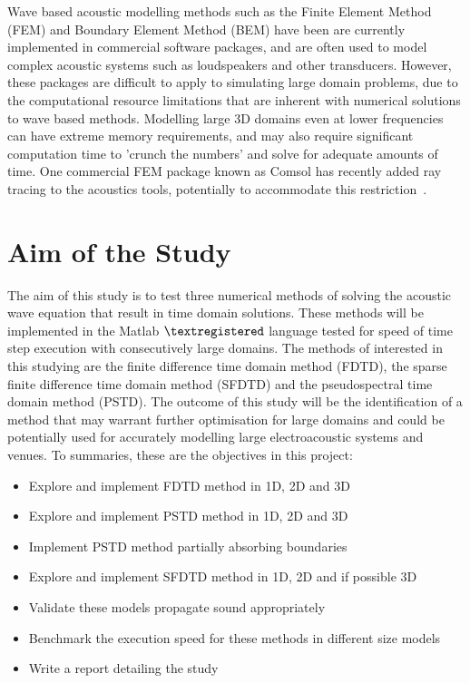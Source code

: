 Wave based acoustic modelling methods such as the Finite Element Method (FEM) and Boundary Element Method (BEM) have been are currently implemented in commercial software packages, and are often used to model complex acoustic systems such as loudspeakers and other transducers. However, these packages are difficult to apply to simulating large domain problems, due to the computational resource limitations that are inherent with numerical solutions to wave based methods. Modelling large 3D domains even at lower frequencies can have extreme memory requirements, and may also require significant computation time to 'crunch the numbers' and solve for adequate amounts of time. One commercial FEM package known as Comsol has recently added ray tracing to the acoustics tools, potentially to accommodate this restriction~\cite{Jensen2016}.\\

\section{Aim of the Study}

The aim of this study is to test three numerical methods of solving the acoustic wave equation that result in time domain solutions. These methods will be implemented in the Matlab $\textregistered $ language tested for speed of time step execution with consecutively large domains. The methods of interested in this studying are the finite difference time domain method (FDTD), the sparse finite difference time domain method (SFDTD) and the pseudospectral time domain method (PSTD). The outcome of this study will be the identification of a method that may warrant further optimisation for large domains and could be potentially used for accurately modelling large electroacoustic systems and venues. To summaries, these are the objectives in this project:\\

\begin{itemize}
\item Explore and implement FDTD method in 1D, 2D and 3D
\item Explore and implement PSTD method in 1D, 2D and 3D
\item Implement PSTD method partially absorbing boundaries
\item Explore and implement SFDTD method in 1D, 2D and if possible 3D
\item Validate these models propagate sound appropriately
\item Benchmark the execution speed for these methods in different size models
\item Write a report detailing the study
\end{itemize}

